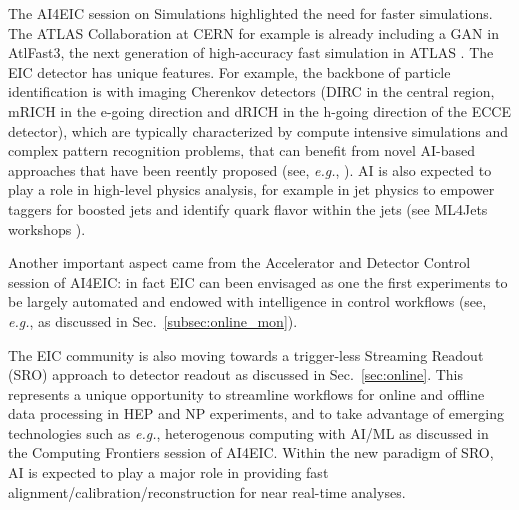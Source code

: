 
The AI4EIC session on Simulations highlighted the need for faster simulations. The ATLAS Collaboration at CERN for example is already including a GAN \cite{creswell2018generative} in AtlFast3, the next generation of high-accuracy fast simulation in ATLAS \cite{atlas2021atlfast3}. 
The EIC detector has unique features. For example, the backbone of particle identification is with imaging Cherenkov detectors \cite{he2020rich} (DIRC in the central region, mRICH in the e-going direction and dRICH in the h-going direction of the ECCE detector), which are typically characterized by compute intensive simulations and complex pattern recognition problems, that can benefit from novel AI-based approaches that have been reently proposed (see, \textit{e.g.}, \cite{fanelli2020deeprich}). %
%
%
%
 AI is also expected to play a role in high-level physics analysis, for example in jet physics to empower taggers for boosted jets and identify quark flavor within the jets (see ML4Jets workshops \cite{ml4jets}).    

Another important aspect came from the Accelerator and Detector Control session of AI4EIC: in fact EIC can been envisaged as one the first experiments to be largely automated and endowed with intelligence in control workflows (see, \textit{e.g.}, \cite{Hydra2021} as discussed in Sec.~\ref{subsec:online_mon}).  

The EIC community is also moving towards a trigger-less Streaming Readout (SRO) approach to detector readout as discussed in Sec.~\ref{sec:online}. 
This represents a unique opportunity to streamline workflows for online and offline data processing in HEP and NP experiments, and to take advantage of emerging technologies such as \textit{e.g.}, heterogenous computing with AI/ML as discussed in the Computing Frontiers session of AI4EIC.
Within the new paradigm of SRO, AI is expected to play a major role in providing fast alignment/calibration/reconstruction for near real-time analyses.









